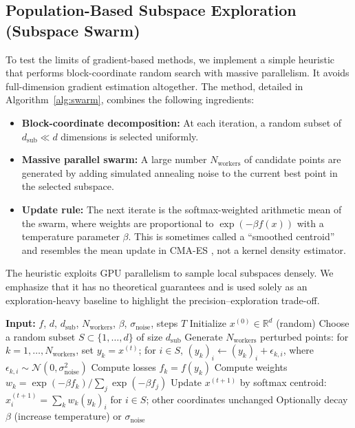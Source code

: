 \documentclass[11pt,a4paper]{article}
\begin{document}
\subsection{Population-Based Subspace Exploration (Subspace Swarm)}
To test the limits of gradient-based methods, we implement a simple heuristic that performs block-coordinate random search with massive parallelism. It avoids full-dimension gradient estimation altogether. The method, detailed in Algorithm~\ref{alg:swarm}, combines the following ingredients:
\begin{itemize}
    \item \textbf{Block-coordinate decomposition:} At each iteration, a random subset of $d_{\text{sub}} \ll d$ dimensions is selected uniformly.
    \item \textbf{Massive parallel swarm:} A large number $N_{\text{workers}}$ of candidate points are generated by adding simulated annealing noise to the current best point in the selected subspace.
    \item \textbf{Update rule:} The next iterate is the softmax-weighted arithmetic mean of the swarm, where weights are proportional to $\exp(-\beta f(x))$ with a temperature parameter $\beta$. This is sometimes called a ``smoothed centroid'' and resembles the mean update in CMA-ES \citep{hansen2016cma}, not a kernel density estimator.
\end{itemize}
The heuristic exploits GPU parallelism to sample local subspaces densely. We emphasize that it has no theoretical guarantees and is used solely as an exploration-heavy baseline to highlight the precision–exploration trade-off.

\begin{algorithm}[t]
\caption{Subspace Swarm (Population-Based Exploration)}
\label{alg:swarm}
\begin{algorithmic}[1]
\State \textbf{Input:} $f$, $d$, $d_{\text{sub}}$, $N_{\text{workers}}$, $\beta$, $\sigma_{\text{noise}}$, steps $T$
\State Initialize $x^{(0)} \in \mathbb{R}^d$ (random)
    \State Choose a random subset $S \subset \{1,\dots,d\}$ of size $d_{\text{sub}}$
    \State Generate $N_{\text{workers}}$ perturbed points: for $k=1,\dots,N_{\text{workers}}$, set $y_k = x^{(t)}$; for $i \in S$, $(y_k)_i \leftarrow (y_k)_i + \epsilon_{k,i}$, where $\epsilon_{k,i} \sim \mathcal{N}(0,\sigma_{\text{noise}}^2)$
    \State Compute losses $f_k = f(y_k)$
    \State Compute weights $w_k = \exp(-\beta f_k) / \sum_{j} \exp(-\beta f_j)$
    \State Update $x^{(t+1)}$ by softmax centroid: $x^{(t+1)}_i = \sum_k w_k (y_k)_i$ for $i \in S$; other coordinates unchanged
    \State Optionally decay $\beta$ (increase temperature) or $\sigma_{\text{noise}}$
\EndFor
\end{algorithmic}
\end{algorithm}
\end{document}
